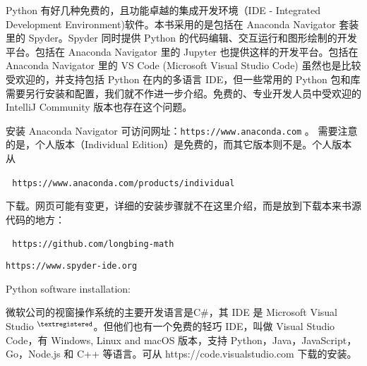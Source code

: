 \documentclass[main.tex]{subfiles}
\begin{document}
	
Python 有好几种免费的，且功能卓越的集成开发环境（IDE - Integrated Development Environment)软件。本书采用的是包括在
Anaconda Navigator  套装里的 Spyder。Spyder 同时提供 Python 的代码编辑、交互运行和图形绘制的开发平台。包括在 Anaconda Navigator 里的 Jupyter 也提供这样的开发平台。包括在 Anaconda Navigator 里的 VS Code (Microsoft Visual Studio Code) 虽然也是比较受欢迎的，并支持包括 Python 在内的多语言 IDE，但一些常用的 Python 包和库需要另行安装和配置，我们就不作进一步介绍。免费的、专业开发人员中受欢迎的 IntelliJ Community 版本也存在这个问题。

安装 Anaconda Navigator 可访问网址：\texttt{https://www.anaconda.com} 。
需要注意的是，个人版本（Individual Edition）是免费的，而其它版本则不是。个人版本从

\,\,\,\,\texttt{https://www.anaconda.com/products/individual} 

\noindent 下载。网页可能有变更，详细的安装步骤就不在这里介绍，而是放到下载本来书源代码的地方：

\,\,\,\,\texttt{https://github.com/longbing-math} 

\verb|https://www.spyder-ide.org|

Python software installation:



微软公司的视窗操作系统的主要开发语言是C\#，其 IDE 是 Microsoft Visual Studio ${}^{\textregistered}$。但他们也有一个免费的轻巧 IDE，叫做 Visual Studio Code，有 Windows, Linux and macOS 版本，支持 Python，Java，JavaScript，Go，Node.js 和 C++ 等语言。可从
https://code.visualstudio.com
下载的安装。
\end{document}
